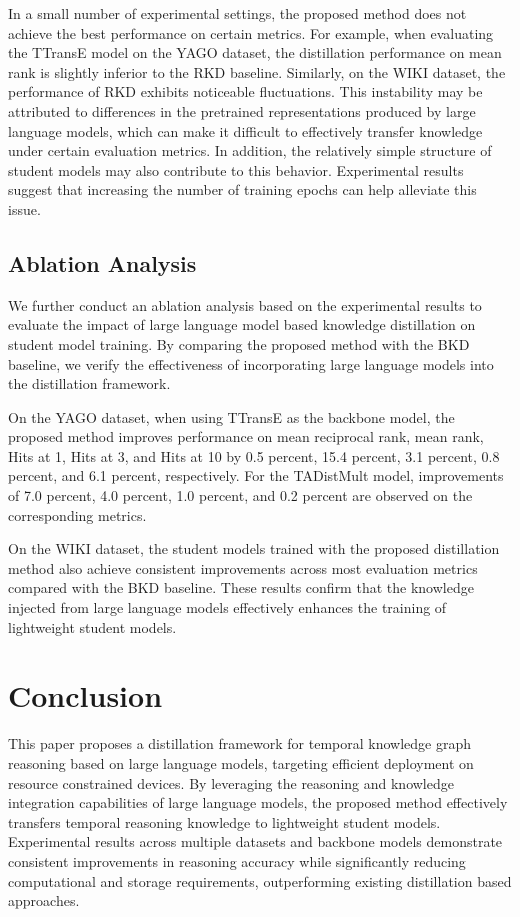 \documentclass[11pt]{article}
\begin{document}
In a small number of experimental settings, the proposed method does not achieve the best performance on certain metrics. For example, when evaluating the TTransE model on the YAGO dataset, the distillation performance on mean rank is slightly inferior to the RKD baseline. Similarly, on the WIKI dataset, the performance of RKD exhibits noticeable fluctuations. This instability may be attributed to differences in the pretrained representations produced by large language models, which can make it difficult to effectively transfer knowledge under certain evaluation metrics. In addition, the relatively simple structure of student models may also contribute to this behavior. Experimental results suggest that increasing the number of training epochs can help alleviate this issue.

\subsection{Ablation Analysis}

We further conduct an ablation analysis based on the experimental results to evaluate the impact of large language model based knowledge distillation on student model training. By comparing the proposed method with the BKD baseline, we verify the effectiveness of incorporating large language models into the distillation framework.

On the YAGO dataset, when using TTransE as the backbone model, the proposed method improves performance on mean reciprocal rank, mean rank, Hits at 1, Hits at 3, and Hits at 10 by 0.5 percent, 15.4 percent, 3.1 percent, 0.8 percent, and 6.1 percent, respectively. For the TADistMult model, improvements of 7.0 percent, 4.0 percent, 1.0 percent, and 0.2 percent are observed on the corresponding metrics.

On the WIKI dataset, the student models trained with the proposed distillation method also achieve consistent improvements across most evaluation metrics compared with the BKD baseline. These results confirm that the knowledge injected from large language models effectively enhances the training of lightweight student models.


\section{Conclusion}

This paper proposes a distillation framework for temporal knowledge graph reasoning based on large language models, targeting efficient deployment on resource constrained devices. By leveraging the reasoning and knowledge integration capabilities of large language models, the proposed method effectively transfers temporal reasoning knowledge to lightweight student models. Experimental results across multiple datasets and backbone models demonstrate consistent improvements in reasoning accuracy while significantly reducing computational and storage requirements, outperforming existing distillation based approaches.
\end{document}
